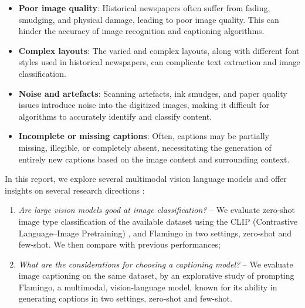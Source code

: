 \begin{itemize}
    \item \textbf{Poor image quality}: Historical newspapers often suffer from fading, smudging, and physical damage, leading to poor image quality. This can hinder the accuracy of image recognition and captioning algorithms.
    \item \textbf{Complex layouts}: The varied and complex layouts, along with different font styles used in historical newspapers, can complicate text extraction and image classification.
    \item \textbf{Noise and artefacts}: Scanning artefacts, ink smudges, and paper quality issues introduce noise into the digitized images, making it difficult for algorithms to accurately identify and classify content.
    \item  \textbf{Incomplete or missing captions}: Often, captions may be partially missing, illegible, or completely absent, necessitating the generation of entirely new captions based on the image content and surrounding context.
\end{itemize}

In this report, we explore several multimodal vision language models and offer insights on several research directions \parencite{bisk2020experience}:
\begin{enumerate}
    \item \textit{Are large vision models good at image classification?} -- We evaluate zero-shot image type classification of the available dataset using the CLIP (Contrastive Language–Image Pretraining) \parencite{radford2021learning}, and Flamingo \parencite{alayrac2022flamingo} in two settings, zero-shot and few-shot.
    We then compare with previous performances;
    \item \textit{What are the considerations for choosing a captioning model?} -- We evaluate image captioning on the same dataset, by an explorative study of prompting Flamingo, a multimodal, vision-language model, known for its ability in generating captions in two settings, zero-shot and few-shot. %
\end{enumerate}

